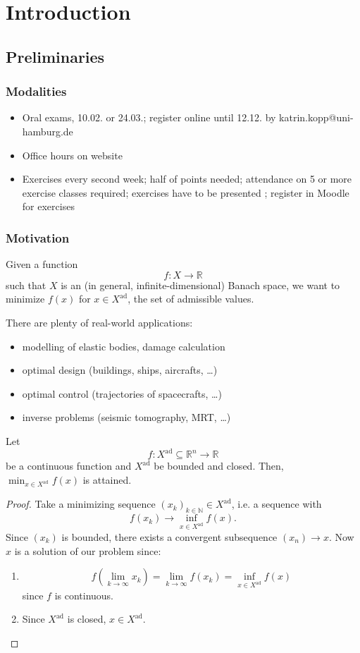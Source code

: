 \chapter{Introduction}
\setcounter{section}{-1}
\section{Preliminaries}
\subsection*{Modalities}
\begin{itemize}
    \item Oral exams, 10.02. or 24.03.; register online until 12.12. by katrin.kopp@uni-hamburg.de
    \item Office hours on website
    \item Exercises every second week; half of points needed; attendance on 5 or more exercise classes required; exercises have to be presented ; register in Moodle for exercises
\end{itemize}

\subsection*{Motivation}
Given a function \[
f: X \to \mathbb{R}
\] such that $X$ is an (in general, infinite-dimensional) Banach space, we want to minimize $f(x)$ for $x \in X^\text{ad}$, the set of admissible values.
\begin{eg}
    There are plenty of real-world applications:
    \begin{itemize}
        \item modelling of elastic bodies, damage calculation
        \item optimal design (buildings, ships, aircrafts,  \dots )
        \item optimal control (trajectories of spacecrafts, \dots)
        \item inverse problems (seismic tomography, MRT, \dots)
    \end{itemize}
\end{eg}
\begin{theorem}
    Let \[
        f: X^\text{ad} \subseteq \mathbb{R}^n \to \mathbb{R}
    \] be a continuous function and $X^\text{ad}$ be bounded and closed. Then, $\min_{x \in X^\text{ad}} f(x)$ is attained. 
\end{theorem}
\begin{proof}
    Take a minimizing sequence $(x_k)_{k \in \mathbb{N}} \in X^\text{ad}$, i.e. a sequence with \[
        f(x_k) \to \inf_{x \in X^\text{ad}} f(x)
    .\] Since $(x_k)$ is bounded, there exists a convergent subsequence $(x_n) \to x$. Now $x$ is a solution of our problem since:
    \begin{enumerate}
    \item \[f(\lim_{k \to \infty} x_k) = \lim_{k \to \infty} f(x_k) = \inf_{x \in X^\text{ad}} f(x)\] since $f$ is continuous.
    \item Since $X^\text{ad}$ is closed, $x \in X^\text{ad}.$  
    \end{enumerate}
\end{proof}


